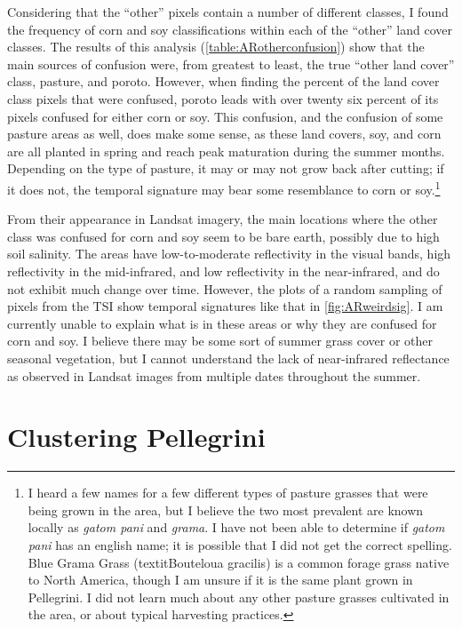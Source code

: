 Considering that the ``other'' pixels contain a number of different classes, I found the frequency of corn and soy classifications within each of the ``other'' land cover classes. The results of this analysis (\autoref{table:ARotherconfusion}) show that the main sources of confusion were, from greatest to least, the true ``other land cover'' class, pasture, and poroto. However, when finding the percent of the land cover class pixels that were confused, poroto leads with over twenty six percent of its pixels confused for either corn or soy. This confusion, and the confusion of some pasture areas as well, does make some sense, as these land covers, soy, and corn are all planted in spring and reach peak maturation during the summer months. Depending on the type of pasture, it may or may not grow back after cutting; if it does not, the temporal signature may bear some resemblance to corn or soy.\footnote{I heard a few names for a few different types of pasture grasses that were being grown in the area, but I believe the two most prevalent are known locally as \textit{\textspanish{gatom pani}} and \textit{\textspanish{grama}}. I have not been able to determine if \textit{\textspanish{gatom pani}} has an english name; it is possible that I did not get the correct spelling. Blue Grama Grass (textit{Bouteloua gracilis}) is a common forage grass native to North America, though I am unsure if it is the same plant grown in Pellegrini. I did not learn much about any other pasture grasses cultivated in the area, or about typical harvesting practices.}

From their appearance in Landsat imagery, the main locations where the other class was confused for corn and soy seem to be bare earth, possibly due to high soil salinity. The areas have low-to-moderate reflectivity in the visual bands, high reflectivity in the mid-infrared, and low reflectivity in the near-infrared, and do not exhibit much change over time. However, the plots of a random sampling of pixels from the TSI show temporal signatures like that in \autoref{fig:ARweirdsig}. I am currently unable to explain what is in these areas or why they are confused for corn and soy. I believe there may be some sort of summer grass cover or other seasonal vegetation, but I cannot understand the lack of near-infrared reflectance as observed in Landsat images from multiple dates throughout the summer.

\section{Clustering Pellegrini}

